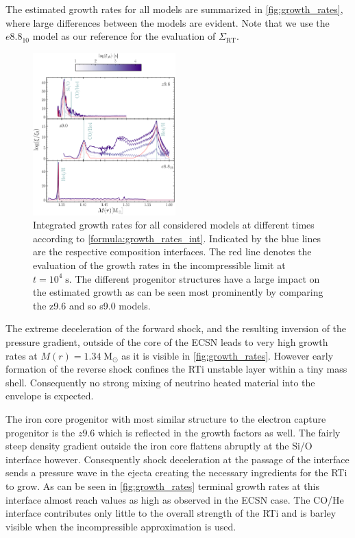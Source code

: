 \documentclass[fleqn,usenatbib]{mnras}
\begin{document}
The estimated growth rates for all models are summarized in \autoref{fig:growth_rates}, where large differences between the models are evident. Note that we use the $e8.8_{10}$ model as our reference for the evaluation of $\Sigma_{\mathrm{RT}}$.


\begin{figure}
 
 \centering
 \includegraphics[width=0.49\textwidth]{pic/growth_rates_1d.pdf}
 \caption{Integrated growth rates for all considered models at different times according to \autoref{formula:growth_rates_int}. Indicated by the blue lines are the respective composition interfaces. The red line denotes the evaluation of the growth rates in the incompressible limit at $t=10^{4}\;\mathrm{s}$. The different progenitor structures have a large impact on the estimated growth as can be seen most prominently by comparing the z9.6 and so s9.0 models. }
 \label{fig:growth_rates}
\end{figure}

The extreme deceleration of the forward shock, and the resulting inversion of the pressure gradient, outside of the core of the ECSN leads to very high growth rates at $M(r)=1.34\;\mathrm{M_{\odot}}$ as it is visible in \autoref{fig:growth_rates}. However early formation of the reverse shock confines the RTi unstable layer within a tiny mass shell. Consequently no strong mixing of  neutrino heated material into the envelope is expected.

The iron core progenitor with most similar structure to the electron capture progenitor is the $z9.6$ which is reflected in the growth factors as well.
The fairly steep density gradient outside the iron core flattens abruptly at the Si/O interface however. Consequently shock deceleration at the passage of the interface sends a pressure wave in the ejecta creating the necessary ingredients for the RTi to grow. As can be seen in \autoref{fig:growth_rates} terminal growth rates at this interface almost reach values as high as observed in the ECSN case. The CO/He interface contributes only little to the overall strength of the RTi and is barley visible when the incompressible approximation is used.
\end{document}
